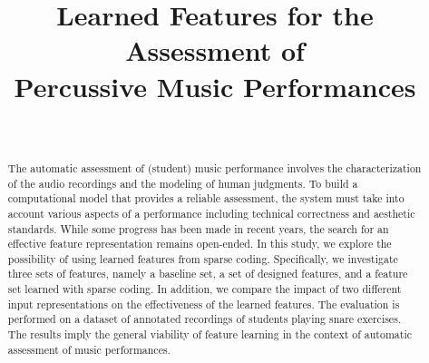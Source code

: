 \documentclass[conference]{IEEEtran}
\begin{document}
%
\title{Learned Features for the Assessment of\\ Percussive Music Performances}

\author{
\and
{}
\\}





\maketitle


\begin{abstract}
The automatic assessment of (student) music performance involves the characterization of the audio recordings and the modeling of human judgments. To build a computational model that provides a reliable assessment, the system must take into account various aspects of a performance including technical correctness and aesthetic standards. While some progress has been made in recent years, the search for an effective feature representation remains open-ended. In this study, we explore the possibility of using learned features from sparse coding. Specifically, we investigate three sets of features, namely a baseline set, a set of designed features, and a feature set learned with sparse coding. In addition, we compare the impact of two different input representations on the effectiveness of the learned features. The evaluation is performed on a dataset of annotated recordings of students playing snare exercises. The results imply the general viability of feature learning in the context of automatic assessment of music performances.   
\end{abstract}
\end{document}
